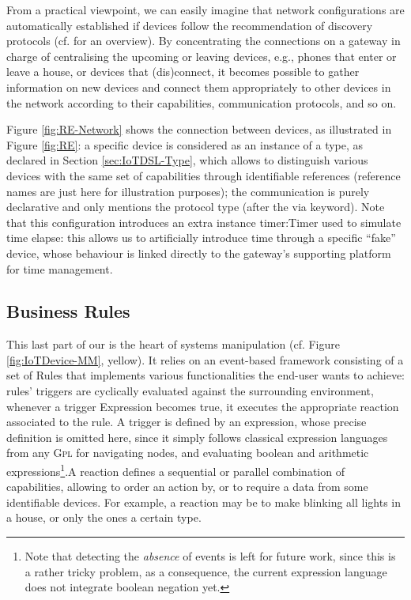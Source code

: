 From a practical viewpoint, we can easily imagine that network configurations are automatically established if devices follow the recommendation of discovery protocols (cf. \cite{} for an overview). By concentrating the connections on a gateway in charge of centralising the upcoming or leaving devices, e.g., phones that enter or leave a house, or devices that (dis)connect, it becomes possible to gather information on new devices and connect them appropriately to other devices in the network according to their capabilities, communication protocols, and so on.

Figure \ref{fig:RE-Network} shows the connection between devices, as illustrated in Figure \ref{fig:RE}: a specific device is considered as an instance of a type, as declared in Section \ref{sec:IoTDSL-Type}, which allows to distinguish various devices with the same set of capabilities through identifiable references (reference names are just here for illustration purposes); the communication is purely declarative and only mentions the protocol type (after the \textsf{via} keyword). Note that this configuration introduces an extra instance \textsf{timer:Timer} used to simulate time elapse: this allows us to artificially introduce time through a specific ``fake'' device, whose behaviour is linked directly to the gateway's supporting platform for time management.


	
\subsection{Business Rules}
\label{sec:IoTDSL-BusinessRules}

This last part of our \DSL is the heart of \IOT systems manipulation (cf. Figure \ref{fig:IoTDevice-MM}, yellow). It relies on an event-based framework consisting of a set of \textsf{Rule}s that implements various functionalities the end-user wants to achieve: rules' \textsf{trigger}s are cyclically evaluated against the surrounding environment, whenever a \textsf{trigger} \textsf{Expression} becomes true, it executes the appropriate \textsf{reaction} associated to the rule. A \textsf{trigger} is defined by an expression, whose precise definition is omitted here, since it simply follows classical expression languages from any \textsc{Gpl} for navigating nodes, and evaluating boolean and arithmetic expressions\footnote{Note that detecting the \emph{absence} of events is left for future work, since this is a rather tricky problem, as a consequence, the current expression language does not integrate boolean negation yet.}.A \textsf{reaction} defines a sequential or parallel combination of capabilities, allowing to order an action by, or to require a data from some identifiable devices. For example, a \textsf{reaction} may be to make blinking all lights in a house, or only the ones a certain type.
	
